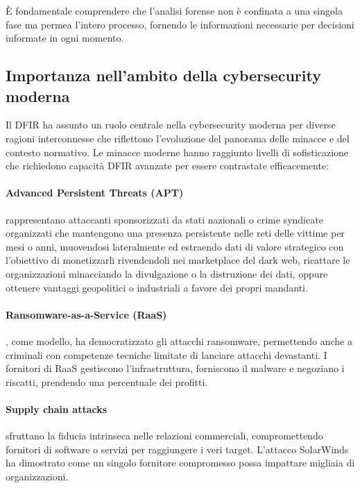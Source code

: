 È fondamentale comprendere che l'analisi forense non è confinata a una singola fase ma permea l'intero processo, fornendo le informazioni necessarie per decisioni informate in ogni momento.

\subsection{Importanza nell'ambito della cybersecurity moderna}

Il DFIR ha assunto un ruolo centrale nella cybersecurity moderna per diverse ragioni interconnesse che riflettono l'evoluzione del panorama delle minacce e del contesto normativo. Le minacce moderne hanno raggiunto livelli di sofisticazione che richiedono capacità DFIR avanzate per essere contrastate efficacemente:

\paragraph{Advanced Persistent Threats (APT)} rappresentano attaccanti sponsorizzati da stati nazionali o crime syndicate organizzati che mantengono una presenza persistente nelle reti delle vittime per mesi o anni, muovendosi lateralmente ed estraendo dati di valore strategico con l'obiettivo di monetizzarli rivendendoli nei marketplace del dark web, ricattare le organizzazioni minacciando la divulgazione o la distruzione dei dati, oppure ottenere vantaggi geopolitici o industriali a favore dei propri mandanti.

\paragraph{Ransomware-as-a-Service (RaaS)}, come modello, ha democratizzato gli attacchi ransomware, permettendo anche a criminali con competenze tecniche limitate di lanciare attacchi devastanti. I fornitori di RaaS gestiscono l'infrastruttura, forniscono il malware e negoziano i riscatti, prendendo una percentuale dei profitti.

\paragraph{Supply chain attacks} sfruttano la fiducia intrinseca nelle relazioni commerciali, compromettendo fornitori di software o servizi per raggiungere i veri target. L'attacco SolarWinds \cite{solarwinds2020} ha dimostrato come un singolo fornitore compromesso possa impattare migliaia di organizzazioni.

